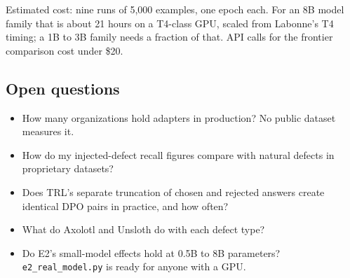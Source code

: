 Estimated cost: nine runs of 5,000 examples, one epoch each. For an 8B model family that is about 21 hours on a T4-class GPU, scaled from Labonne's T4 timing; a 1B to 3B family needs a fraction of that. API calls for the frontier comparison cost under \$20.

\subsection{Open questions}

\begin{itemize}
\tightlist
\item
  How many organizations hold adapters in production? No public dataset measures it.
\item
  How do my injected-defect recall figures compare with natural defects in proprietary datasets?
\item
  Does TRL's separate truncation of chosen and rejected answers create identical DPO pairs in practice, and how often?
\item
  What do Axolotl and Unsloth do with each defect type?
\item
  Do E2's small-model effects hold at 0.5B to 8B parameters? \texttt{e2\_real\_model.py} is ready for anyone with a GPU.
\end{itemize}
